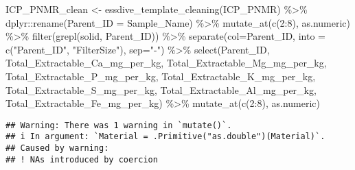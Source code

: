 \documentclass[
]{article}
\newenvironment{Shaded}{\begin{snugshade}}{\end{snugshade}}
\newcommand{\AttributeTok}[1]{\textcolor[rgb]{0.77,0.63,0.00}{#1}}
\newcommand{\DecValTok}[1]{\textcolor[rgb]{0.00,0.00,0.81}{#1}}
\newcommand{\FunctionTok}[1]{\textcolor[rgb]{0.00,0.00,0.00}{#1}}
\newcommand{\NormalTok}[1]{#1}
\newcommand{\OtherTok}[1]{\textcolor[rgb]{0.56,0.35,0.01}{#1}}
\newcommand{\SpecialCharTok}[1]{\textcolor[rgb]{0.00,0.00,0.00}{#1}}
\newcommand{\StringTok}[1]{\textcolor[rgb]{0.31,0.60,0.02}{#1}}
\begin{document}
\begin{Shaded}
\begin{Highlighting}[]
\NormalTok{ICP\_PNMR\_clean }\OtherTok{\textless{}{-}} \FunctionTok{essdive\_template\_cleaning}\NormalTok{(ICP\_PNMR) }\SpecialCharTok{\%\textgreater{}\%}
\NormalTok{  dplyr}\SpecialCharTok{::}\FunctionTok{rename}\NormalTok{(}\AttributeTok{Parent\_ID =} \StringTok{\textquotesingle{}Sample\_Name\textquotesingle{}}\NormalTok{) }\SpecialCharTok{\%\textgreater{}\%}
  \FunctionTok{mutate\_at}\NormalTok{(}\FunctionTok{c}\NormalTok{(}\DecValTok{2}\SpecialCharTok{:}\DecValTok{8}\NormalTok{), as.numeric) }\SpecialCharTok{\%\textgreater{}\%}
  \FunctionTok{filter}\NormalTok{(}\FunctionTok{grepl}\NormalTok{(}\StringTok{\textquotesingle{}solid\textquotesingle{}}\NormalTok{, Parent\_ID)) }\SpecialCharTok{\%\textgreater{}\%}
  \FunctionTok{separate}\NormalTok{(}\AttributeTok{col=}\NormalTok{Parent\_ID, }\AttributeTok{into =} \FunctionTok{c}\NormalTok{(}\StringTok{"Parent\_ID"}\NormalTok{, }\StringTok{"FilterSize"}\NormalTok{), }\AttributeTok{sep=}\StringTok{"{-}"}\NormalTok{) }\SpecialCharTok{\%\textgreater{}\%}
  \FunctionTok{select}\NormalTok{(Parent\_ID, Total\_Extractable\_Ca\_mg\_per\_kg,  Total\_Extractable\_Mg\_mg\_per\_kg, Total\_Extractable\_P\_mg\_per\_kg, Total\_Extractable\_K\_mg\_per\_kg,  Total\_Extractable\_S\_mg\_per\_kg, Total\_Extractable\_Al\_mg\_per\_kg, Total\_Extractable\_Fe\_mg\_per\_kg) }\SpecialCharTok{\%\textgreater{}\%}
  \FunctionTok{mutate\_at}\NormalTok{(}\FunctionTok{c}\NormalTok{(}\DecValTok{2}\SpecialCharTok{:}\DecValTok{8}\NormalTok{), as.numeric) }
\end{Highlighting}
\end{Shaded}

\begin{verbatim}
## Warning: There was 1 warning in `mutate()`.
## i In argument: `Material = .Primitive("as.double")(Material)`.
## Caused by warning:
## ! NAs introduced by coercion
\end{verbatim}
\end{document}
